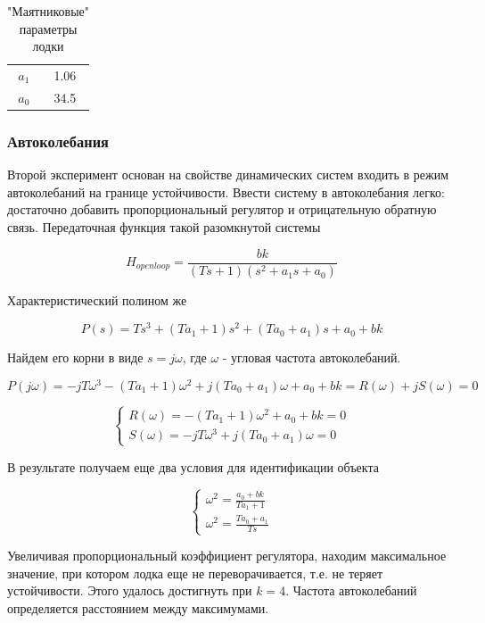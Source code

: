 \documentclass[12pt,a4paper]{article}
\begin{document}
\begin{table}[h]
	\caption{"Маятниковые" параметры лодки}
	\label{pend_boat_params}
	\begin{center}
		\begin{tabular}{cc}
			$a_1$ &  1.06 \\
			$a_0$ &  34.5 \\
		\end{tabular}
	\end{center}
\end{table}


\subsubsection{Автоколебания}

Второй эксперимент основан на свойстве динамических систем входить в режим автоколебаний на границе устойчивости. Ввести систему в автоколебания легко: достаточно добавить пропорциональный регулятор и отрицательную обратную связь. Передаточная функция такой разомкнутой системы

$$ H_{openloop} = \frac{bk}{(Ts+1)(s^2+a_1s+a_0)} $$

Характеристический полином же

$$ P(s) = Ts^3 + (Ta_1+1)s^2 + (Ta_0+a_1)s + a_0 + bk $$

Найдем его корни в виде $s=j\omega$, где $\omega$ - угловая частота автоколебаний.

$$ P(j\omega) = -jT\omega^3 - (Ta_1+1)\omega^2 + j(Ta_0+a_1)\omega + a_0 + bk  = R(\omega) + jS(\omega) = 0$$

\begin{equation*}
	\begin{cases}
		R(\omega) = - (Ta_1+1)\omega^2 + a_0 + bk = 0
		\\
		S(\omega) = -jT\omega^3 + j(Ta_0+a_1)\omega = 0
	\end{cases}
\end{equation*}

В результате получаем еще два условия для идентификации объекта

\begin{equation*}
	\label{self_oscil_cond}
	\begin{cases}
		\omega^2 = \frac{a_0 + bk}{Ta_1 + 1}
		\\
		\omega^2 = \frac{Ta_0+a_1}{Ts}
	\end{cases}
\end{equation*}

Увеличивая пропорциональный коэффициент регулятора, находим максимальное значение, при котором лодка еще не переворачивается, т.е. не теряет устойчивости. Этого удалось достигнуть при $k = 4$. Частота автоколебаний определяется расстоянием между максимумами.
\end{document}
